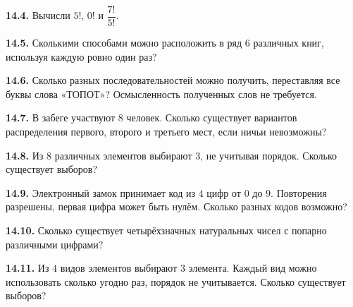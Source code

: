 \noindent\begin{minipage}[t]{\linewidth}\textbf{14.4.} Вычисли \(5!\), \(0!\) и \(\dfrac{7!}{5!}\).\par\end{minipage}\par
\noindent\begin{minipage}[t]{\linewidth}\textbf{14.5.} Сколькими способами можно расположить в ряд \(6\) различных книг, используя каждую ровно один раз?\par\end{minipage}\par
\noindent\begin{minipage}[t]{\linewidth}\textbf{14.6.} Сколько разных последовательностей можно получить, переставляя все буквы слова «ТОПОТ»? Осмысленность полученных слов не требуется.\par\end{minipage}\par
\noindent\begin{minipage}[t]{\linewidth}\textbf{14.7.} В забеге участвуют \(8\) человек. Сколько существует вариантов распределения первого, второго и третьего мест, если ничьи невозможны?\par\end{minipage}\par
\noindent\begin{minipage}[t]{\linewidth}\textbf{14.8.} Из \(8\) различных элементов выбирают \(3\), не учитывая порядок. Сколько существует выборов?\par\end{minipage}\par
\noindent\begin{minipage}[t]{\linewidth}\textbf{14.9.} Электронный замок принимает код из \(4\) цифр от \(0\) до \(9\). Повторения разрешены, первая цифра может быть нулём. Сколько разных кодов возможно?\par\end{minipage}\par
\noindent\begin{minipage}[t]{\linewidth}\textbf{14.10.} Сколько существует четырёхзначных натуральных чисел с попарно различными цифрами?\par\end{minipage}\par
\noindent\begin{minipage}[t]{\linewidth}\textbf{14.11.} Из \(4\) видов элементов выбирают \(3\) элемента. Каждый вид можно использовать сколько угодно раз, порядок не учитывается. Сколько существует выборов?\par\end{minipage}\par
